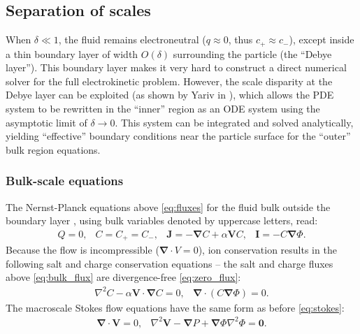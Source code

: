 \documentclass[preprint,10pt]{elsarticle}
\newcommand{\pars}[1]{\left(#1\right)}
\newcommand\Laplacian{\nabla^2}
\newcommand\bnabla{\boldsymbol{\nabla}}
\newcommand\bV{\boldsymbol{V}}
\newcommand\bI{\boldsymbol{I}}
\newcommand\bJ{\boldsymbol{J}}
\newcommand\bzero{\boldsymbol{0}}
\begin{document}
\subsection{Separation of scales}
When $\delta \ll 1$, 
the fluid remains electroneutral ($q \approx 0$, thus $c_+ \approx c_-$), 
except inside a thin boundary layer of width $O(\delta)$ 
surrounding the particle (the ``Debye layer'').
This boundary layer makes it very hard to construct 
a direct numerical solver for the full electrokinetic problem.
However, the scale disparity at the Debye layer can be exploited
(as shown by Yariv in \cite{yariv2010asymptotic}), 
which allows the PDE system to be rewritten in the ``inner'' region 
as an ODE system using the asymptotic limit of $\delta \rightarrow 0$.
This system can be integrated and solved analytically,
yielding ``effective'' boundary conditions near
the particle surface for the ``outer'' bulk region equations.

\subsubsection  {Bulk-scale equations}
The Nernst-Planck equations above \eqref{eq:fluxes} for the fluid bulk outside
the boundary layer \cite{yariv2010asymptotic}, 
using bulk variables denoted by uppercase letters, read:
\begin{equation} \begin{array}{cccc} \label{eq:bulk_flux}
  Q = 0, &
  C = C_+ = C_-, &
\bJ = -\bnabla C + \alpha \bV C, &
\bI = -C \bnabla \varPhi.
\end{array}\end{equation}
Because the flow is incompressible ($\bnabla \cdot V = 0$), 
ion conservation results in the following 
salt and charge conservation equations -- the salt and charge fluxes above 
\eqref{eq:bulk_flux} are divergence-free
\eqref{eq:zero_flux}:
\begin{equation} \begin{array}{ccc}
\label{eq:salt_charge}
\Laplacian C - \alpha \bV \cdot \bnabla C = 0, &
\bnabla \cdot \pars{ C \bnabla \varPhi } = 0.
\end{array}\end{equation}
The macroscale Stokes flow equations have the same form as before \eqref{eq:stokes}:
\begin{equation}
\begin{array}{ccc}
\bnabla \cdot \bV = 0, &   
\Laplacian \bV - \bnabla P + \bnabla \varPhi \Laplacian \varPhi = \bzero.
\end{array}
\end{equation}
\end{document}
